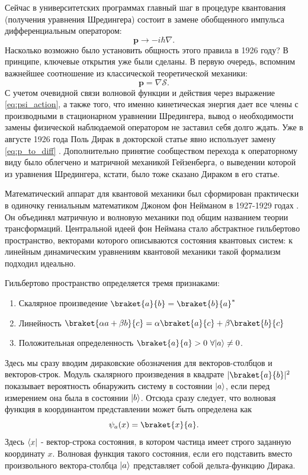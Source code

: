 \documentclass[14pt, a4paper]{extreport}
\DeclarePairedDelimiter\bra{\langle}{\rvert}
\DeclarePairedDelimiter\ket{\lvert}{\rangle}
\numberwithin{equation}{section}
\begin{document}
Сейчас в университетских программах главный шаг в процедуре квантования (получения уравнения Шредингера) состоит в замене обобщенного импульса дифференциальным оператором:
\begin{equation}
	\mathbf p \rightarrow -i\hbar \nabla. \label{eq:p_to_diff}
\end{equation}
Насколько возможно было установить общность этого правила в 1926 году? В принципе, ключевые открытия уже были сделаны. В первую очередь, вспомним важнейшее соотношение из классической теоретической механики:
\begin{equation}
	\mathbf p = \nabla \mathcal S.
\end{equation}
С учетом очевидной связи волновой функции и действия через выражение \eqref{eq:psi_action}, а также того, что именно кинетическая энергия дает все члены с производными в стационарном уравнении Шредингера, вывод о необходимости замены физической наблюдаемой оператором не заставил себя долго ждать. Уже в августе 1926 года Поль Дирак в докторской статье явно использует замену \eqref{eq:p_to_diff} \cite{dirac1926theory}. Дополнительно принятие сообществом перехода к операторному виду было облегчено и матричной механикой Гейзенберга, о выведении которой из уравнения Шредингера, кстати, было тоже сказано Дираком в его статье.

Математический аппарат для квантовой механики был сформирован практически в одиночку гениальным математиком Джоном фон Нейманом в 1927-1929 годах \cite{von2018mathematical}. Он объединял матричную и волновую механики под общим названием теории трансформаций. Центральной идеей фон Неймана стало абстрактное гильбертово пространство, векторами которого описываются состояния квантовых систем: к линейным динамическим уравнениям квантовой механики такой формализм подходил идеально. 

Гильбертово пространство определяется тремя признаками:
\begin{enumerate}
	\item Скалярное произведение $\braket{a}{b} = \braket{b}{a}^*$
	\item Линейность $\braket{\alpha a + \beta b}{c} = \alpha\braket{a}{c} + \beta\braket{b}{c}$
	\item Положительная определенность $ \braket{a}{a} >0 \  \forall \ket{a} \neq 0$. 
\end{enumerate}

Здесь мы сразу вводим дираковские обозначения для векторов-столбцов и векторов-строк. Модуль скалярного произведения в квадрате $|\braket{a}{b}|^2$ показывает вероятность обнаружить систему в состоянии $\ket{a}$, если перед измерением она была в состоянии $\ket{b}$. Отсюда сразу следует, что волновая функция в координантом представлении может быть определена как
\begin{equation}
	\psi_a(x) = \braket{x}{a}.
\end{equation}
Здесь $\bra{x}$ - вектор-строка состояния, в котором частица имеет строго заданную координату $x$. Волновая функция такого состояния, если его подставить вместо произвольного вектора-столбца $\ket{a}$ представляет собой дельта-функцию Дирака.
\end{document}
